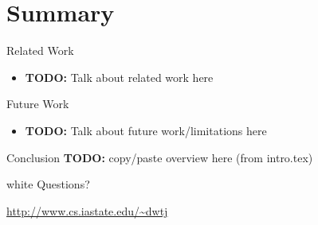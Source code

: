 \section*{Summary}

\begin{frame}{Related Work}
  \begin{itemize}
    \item \textbf{TODO:} Talk about related work here
  \end{itemize}
\end{frame}


\begin{frame}{Future Work}
  \begin{itemize}
    \item \textbf{TODO:} Talk about future work/limitations here
  \end{itemize}
\end{frame}


\begin{frame}{Conclusion}
  \textbf{TODO:} copy/paste overview here (from intro.tex)
\end{frame}


\begin{frame}
\begin{beamercolorbox}[center]{white}
  {\Large Questions?}

  \vspace{2em}\hfill

  \url{http://www.cs.iastate.edu/~dwtj}
\end{beamercolorbox}
\end{frame}
